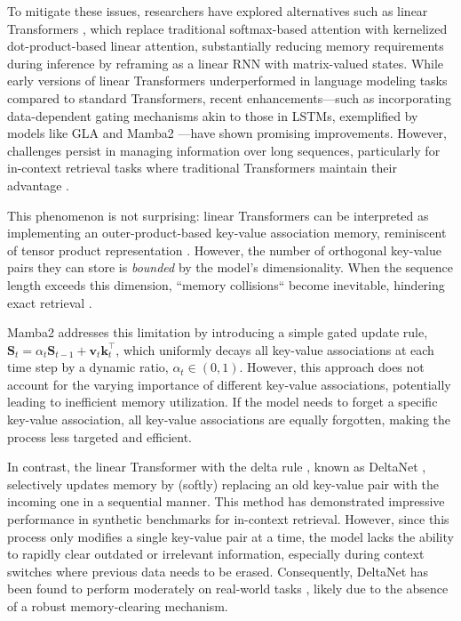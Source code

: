 \documentclass{article}
\def\rmS{{\mathbf{S}}}
\def\vk{{\bm{k}}}
\def\vv{{\bm{v}}}
\begin{document}
To mitigate these issues, researchers have explored alternatives such as linear Transformers \citep{katharopoulos2020transformers}, which replace traditional softmax-based attention with kernelized dot-product-based linear attention, substantially reducing memory requirements during inference by reframing as a linear RNN with matrix-valued states. While early versions of linear Transformers underperformed in language modeling tasks compared to standard Transformers, recent enhancements—such as incorporating data-dependent gating mechanisms akin to those in LSTMs, exemplified by models like GLA \citep{yang_gated_2023} and Mamba2 \citep{mamba2}—have shown promising improvements. However, challenges persist in managing information over long sequences, particularly for in-context retrieval tasks where traditional Transformers maintain their advantage \citep{zoology, arora_simple_2024, jelassi_repeat_2024, wen_rnns_2024, akyurek_-context_2024}.

This phenomenon is not surprising: linear Transformers can be interpreted as implementing an outer-product-based key-value association memory, reminiscent of tensor product representation \citep{DBLP:journals/ai/Smolensky90}. 
However, the number of orthogonal key-value pairs they can store is \emph{bounded} by the model's dimensionality. When the sequence length exceeds this dimension, ``memory collisions`` become inevitable, hindering exact retrieval \citep{linear-xmr-fastweight}.

Mamba2 addresses this limitation by introducing a simple gated update rule, $\rmS_t = \alpha_t \rmS_{t-1} + \vv_t\vk_t^\intercal$, which uniformly decays all key-value associations at each time step by a dynamic ratio, $\alpha_t \in (0,1)$. However, this approach does not account for the varying importance of different key-value associations, potentially leading to inefficient memory utilization. If the model needs to forget a specific key-value association, all key-value associations are equally forgotten, making the process less targeted and efficient.

In contrast, the linear Transformer with the delta rule \citep{widrow_adaptive_1988}, known as DeltaNet \citep{linear-xmr-fastweight, yang2024parallelizing}, selectively updates memory by (softly) replacing an old key-value pair with the incoming one in a sequential manner. This method has demonstrated impressive performance in synthetic benchmarks for in-context retrieval. However, since this process only modifies a single key-value pair at a time, the model lacks the ability to rapidly clear outdated or irrelevant information, especially during context switches where previous data needs to be erased. Consequently, DeltaNet has been found to perform moderately on real-world tasks 
 \citep{yang2024parallelizing}, likely due to the absence of a robust memory-clearing mechanism.
\end{document}

